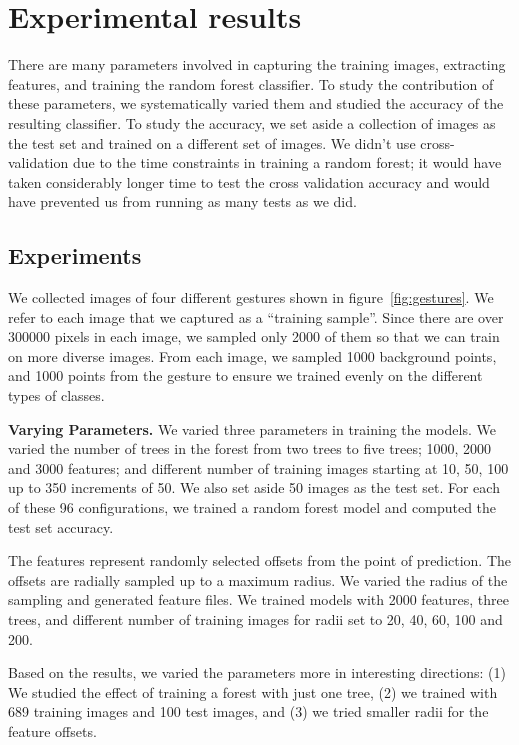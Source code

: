 \section{Experimental results}
\label{sec: experiments}

There are many parameters involved in capturing the training images, extracting features, and training the random forest classifier. To study the contribution of these parameters, we systematically varied them and studied the accuracy of the resulting classifier. To study the accuracy, we set aside a collection of images as the test set and trained on a different set of images. We didn't use cross-validation due to the time constraints in training a random forest; it would have taken considerably longer time to test the cross validation accuracy and would  have prevented us from running as many tests as we did.

\subsection{Experiments}
We collected images of four different gestures shown in figure~\ref{fig:gestures}. We refer to each image that we captured as a ``training sample''. Since there are over 300000 pixels in each image, we sampled only 2000 of them so that we can train on more diverse images. From each image, we sampled 1000 background points, and 1000 points from the gesture to ensure we trained evenly on the different types of classes.

\textbf{Varying Parameters.} We varied three parameters in training the models. We varied the number of trees in the forest from two trees to five trees; 1000, 2000 and 3000 features; and different number of training images starting at 10, 50, 100 up to 350 increments of 50. We also set aside 50 images as the test set. For each of these 96 configurations, we trained a random forest model and computed the test set accuracy.

The features represent randomly selected offsets from the point of prediction. The offsets are radially sampled up to a maximum radius. We varied the radius of the sampling and generated feature files. We trained models with 2000 features, three trees, and different number of training images for radii set to 20, 40, 60, 100 and 200. 

Based on the results, we varied the parameters more in interesting directions: (1) We studied the effect of training a forest with just one tree, (2) we trained with 689 training images and 100 test images, and (3) we tried smaller radii for the feature offsets. 


